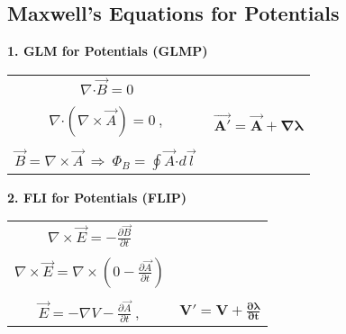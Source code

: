 \documentclass[12pt]{article}
\newcommand*{\dotP}{\boldsymbol \cdot}		%
\begin{document}
\subsection{Maxwell's Equations for Potentials}
\hfill \break
\begin{minipage}[t]{0.5\textwidth}
	\textbf{1. GLM for Potentials (GLMP)}
	\begin{center}
	\begin{tabular}{c c}
		\( \nabla \dotP \vec{B} = 0 \) & \\ \\
		\( \nabla \dotP ( \nabla \times \vec{A} ) = 0 \ , \) & \( \boldsymbol{ \vec{A'} = \vec{A} + \nabla \lambda } \)\\ \\
		\( \boxed{ \vec{B} = \nabla \times \vec{A}
			\ \Rightarrow \ \Phi_B = \oint \vec{A} \dotP d\vec{l} \ } \) & 
	\end{tabular}
	\end{center}
\end{minipage} 
\hspace{0\textwidth}
\begin{minipage}[t]{0.5\textwidth}
\textbf{2. FLI for Potentials (FLIP)}
\begin{center}
\begin{tabular}{c c}
	\( \nabla \times \vec{E} = - \frac{\partial \vec{B}}{\partial t} \) & \\ \\
	\( \nabla \times \vec{E} = \nabla \times \left ( 0 - \frac{\partial \vec{A}}{\partial t} \right ) \) & \\ \\
	\( \boxed{ \vec{E} = - \nabla V - \frac{\partial \vec{A}}{\partial t} } \ , \) & 
		\( \boldsymbol{ V' = V + \frac{\partial \lambda}{\partial t} } \) 
\end{tabular}
\end{center}
\end{minipage} 
\end{document}
